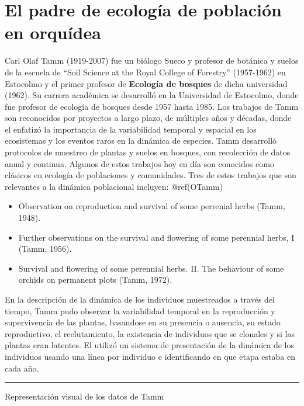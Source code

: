 \documentclass[
  12pt,
  letterpaper,
]{book}
\begin{document}
\section{El padre de ecología de población en
orquídea}\label{el-padre-de-ecologuxeda-de-poblaciuxf3n-en-orquuxeddea}

Carl Olaf Tamm (1919-2007) fue un biólogo Sueco y profesor de botánica y
suelos de la escuela de ``Soil Science at the Royal College of
Forestry'' (1957-1962) en Estocolmo y el primer profesor de
\textbf{Ecología de bosques} de dicha universidad (1962). Su carrera
académica se desarrolló en la Universidad de Estocolmo, donde fue
profesor de ecología de bosques desde 1957 hasta 1985. Los trabajos de
Tamm son reconocidos por proyectos a largo plazo, de múltiples años y
décadas, donde el enfatizó la importancia de la variabilidad temporal y
espacial en los ecosistemas y los eventos raros en la dinámica de
especies. Tamm desarrolló protocolos de muestreo de plantas y suelos en
bosques, con recolección de datos anual y continua. Algunos de estos
trabajos hoy en día son conocidos como clásicos en ecología de
poblaciones y comunidades. Tres de estos trabajos que son relevantes a
la dinámica poblacional incluyen: @ref(OTamm)

\begin{itemize}
\item
  Observation on reproduction and survival of some perrenial herbs
  (Tamm, 1948).
\item
  Further observations on the survival and flowering of some perennial
  herbs, I (Tamm, 1956).
\item
  Survival and flowering of some perennial herbs. II. The behaviour of
  some orchids on permanent plots (Tamm, 1972).
\end{itemize}

En la descripción de la dinámica de los individuos muestreados a través
del tiempo, Tamm pudo observar la variabilidad temporal en la
reproducción y supervivencia de las plantas, basandose en su presencia o
ausencia, su estado reproductivo, el reclutamiento, la existencia de
individuos que se clonales y si las plantas eran latentes. El utilizó un
sistema de presentación de la dinámica de los individuos usando una
línea por individuo e identificando en que etapa estaba en cada año.

\begin{center}\rule{0.5\linewidth}{0.5pt}\end{center}

Representación visual de los datos de Tamm
\end{document}
